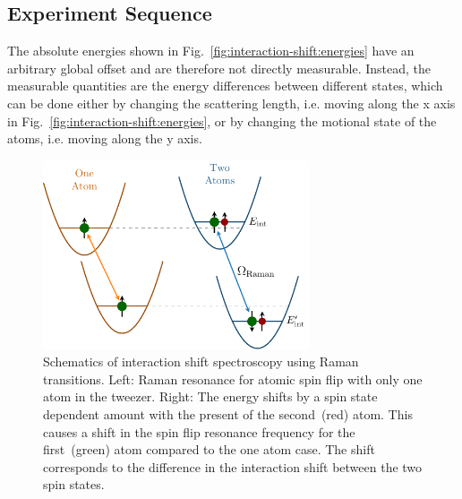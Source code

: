 \subsection{Experiment Sequence}
\label{ch:interaction-shift:spectroscopy:sequence}
The absolute energies shown in Fig.~\ref{fig:interaction-shift:energies} have an arbitrary global
offset and are therefore not directly measurable.
Instead, the measurable quantities are the energy differences between different states,
which can be done either by changing the scattering length,
i.e. moving along the x axis in Fig.~\ref{fig:interaction-shift:energies},
or by changing the motional state of the atoms, i.e. moving along the y axis.

\begin{figure}
  \centering
  \includegraphics[width=0.7\textwidth]{figures/interaction_shift_measure.pdf}
  \caption[Schematics of interaction shift spectroscopy.]{
    Schematics of interaction shift spectroscopy using Raman transitions.
    Left: Raman resonance for atomic spin flip with only one atom in the tweezer.
    Right: The energy shifts by a spin state dependent amount with the present of
    the second~(red) atom. This causes a shift in the spin flip resonance frequency
    for the first~(green) atom compared to the one atom case.
    The shift corresponds to the difference in the interaction shift between the
    two spin states.
    \label{fig:interaction-shift:measure}}
\end{figure}

